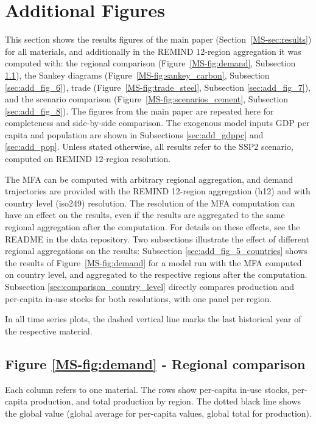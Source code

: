 
\section{Additional Figures} \label{sec:add_figures}

This section shows the results figures of the main paper (Section~\ref{MS-sec:results}) for all materials, and additionally in the REMIND 12-region aggregation it was computed with: the regional comparison (Figure~\ref{MS-fig:demand}, Subsection \ref{sec:add_fig_5}), the Sankey diagrams (Figure~\ref{MS-fig:sankey_carbon}, Subsection \ref{sec:add_fig_6}), trade (Figure~\ref{MS-fig:trade_steel}, Subsection \ref{sec:add_fig_7}), and the scenario comparison (Figure~\ref{MS-fig:scenarios_cement}, Subsection \ref{sec:add_fig_8}). The figures from the main paper are repeated here for completeness and side-by-side comparison.
The exogenous model inputs GDP per capita and population are shown in Subsections \ref{sec:add_gdppc} and \ref{sec:add_pop}.
Unless stated otherwise, all results refer to the SSP2 scenario, computed on REMIND 12-region resolution.

The MFA can be computed with arbitrary regional aggregation, and demand trajectories are provided with the REMIND 12-region aggregation (h12) and with country level (iso249) resolution.
The resolution of the MFA computation can have an effect on the results, even if the results are aggregated to the same regional aggregation after the computation. For details on these effects, see the README in the data repository.
Two subsections illustrate the effect of different regional aggregations on the results: Subsection \ref{sec:add_fig_5_countries} shows the results of Figure~\ref{MS-fig:demand} for a model run with the MFA computed on country level, and aggregated to the respective regions after the computation. Subsection \ref{sec:comparison_country_level} directly compares production and per-capita in-use stocks for both resolutions, with one panel per region.

In all time series plots, the dashed vertical line marks the last historical year of the respective material.

\subsection{Figure \texorpdfstring{\ref{MS-fig:demand}}{5} - Regional comparison} \label{sec:add_fig_5}

Each column refers to one material.
The rows show per-capita in-use stocks, per-capita production, and total production by region.
The dotted black line shows the global value (global average for per-capita values, global total for production).


